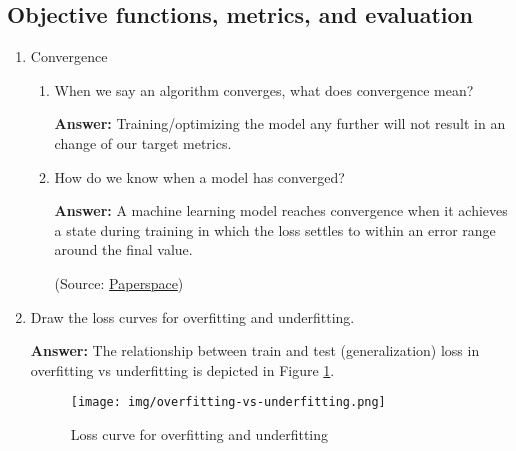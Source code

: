 \documentclass{article}
\newenvironment{QandA}{\begin{enumerate}[label=\arabic*.]}{\end{enumerate}}
\newenvironment{InnerQandA}{\begin{enumerate}[label=\roman*.]}{\end{enumerate}}
\newenvironment{answer}{\par\normalfont \textbf{Answer:}}{}
\begin{document}
\subsection{Objective functions, metrics, and evaluation}
\begin{QandA}
    \item Convergence
    \begin{InnerQandA}
        \item When we say an algorithm converges, what does convergence mean?
        \begin{answer}
            Training/optimizing the model any further will not result in an change of our target metrics.
        \end{answer}

        \item How do we know when a model has converged?
        \begin{answer}
            A machine learning model reaches convergence when it achieves a state during training in which the loss settles to within an error range around the final value.

            (Source: \href{https://machine-learning.paperspace.com/wiki/convergence}{Paperspace})
        \end{answer}
    \end{InnerQandA}

    \item Draw the loss curves for overfitting and underfitting.
    \begin{answer}
        The relationship between train and test (generalization) loss in overfitting vs underfitting is depicted in Figure \ref{fig:overfitting_underfitting}.
    
        \begin{figure}[htb!]
            \centering
            \texttt{[image: img/overfitting-vs-underfitting.png]}
            \caption{Loss curve for overfitting and underfitting \footnotemark }
            \label{fig:overfitting_underfitting}
        \end{figure}
    \end{answer}


\end{QandA}
\end{document}
